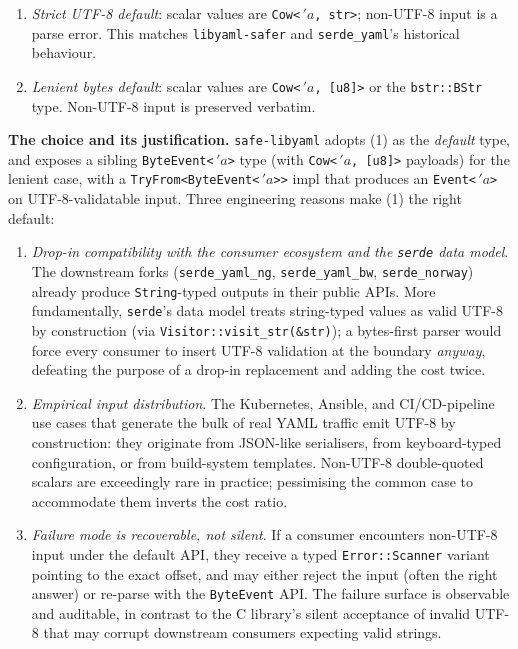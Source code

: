 \documentclass[12pt]{article}
\theoremstyle{definition}
\theoremstyle{remark}
\newcommand{\lifetime}[1]{\ensuremath{\,'\!#1}}
\begin{document}
\begin{enumerate}[leftmargin=2em]
\item \emph{Strict UTF-8 default}: scalar values are
\texttt{Cow<\lifetime{a}, str>}; non-UTF-8 input is a parse error.
This matches \texttt{libyaml-safer} and \texttt{serde\_yaml}'s
historical behaviour.
\item \emph{Lenient bytes default}: scalar values are
\texttt{Cow<\lifetime{a}, [u8]>} or the \texttt{bstr::BStr} type. Non-UTF-8
input is preserved verbatim.
\end{enumerate}

\noindent\textbf{The choice and its justification.} \texttt{safe-libyaml}
adopts (1) as the \emph{default} type, and exposes a sibling
\texttt{ByteEvent<\lifetime{a}>} type (with \texttt{Cow<\lifetime{a}, [u8]>}
payloads) for the lenient case, with a \texttt{TryFrom<ByteEvent<\lifetime{a}>>}
impl that produces an \texttt{Event<\lifetime{a}>} on UTF-8-validatable input.
Three engineering reasons make (1) the right default:

\begin{enumerate}[leftmargin=2em]
\item \emph{Drop-in compatibility with the consumer ecosystem and the
\texttt{serde} data model}. The downstream forks
(\texttt{serde\_yaml\_\allowbreak ng}, \texttt{serde\_yaml\_\allowbreak bw},
\texttt{serde\_\allowbreak norway}) already produce \texttt{String}-typed
outputs in their public APIs. More fundamentally, \texttt{serde}'s data
model treats string-typed values as valid UTF-8 by construction
(via \texttt{Visitor::visit\_str(\&str)}); a bytes-first parser would
force every consumer to insert UTF-8 validation at the boundary
\emph{anyway}, defeating the purpose of a drop-in replacement and adding
the cost twice.
\item \emph{Empirical input distribution}. The Kubernetes, Ansible, and
CI/CD-pipeline use cases that generate the bulk of real YAML traffic
emit UTF-8 by construction: they originate from JSON-like serialisers, from
keyboard-typed configuration, or from build-system templates. Non-UTF-8
double-quoted scalars are exceedingly rare in practice; pessimising the
common case to accommodate them inverts the cost ratio.
\item \emph{Failure mode is recoverable, not silent}. If a consumer encounters
non-UTF-8 input under the default API, they receive a typed
\texttt{Error::Scanner} variant pointing to the exact offset, and may
either reject the input (often the right answer) or re-parse with the
\texttt{ByteEvent} API. The failure surface is observable and
auditable, in contrast to the C library's silent acceptance of invalid
UTF-8 that may corrupt downstream consumers expecting valid strings.
\end{enumerate}
\end{document}
